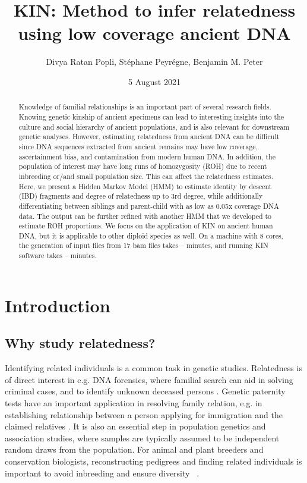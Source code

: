 \documentclass[12pt, letterpaper]{article}
\title{KIN: Method to infer relatedness using low coverage ancient DNA}
\author{Divya Ratan Popli, Stéphane Peyrégne, Benjamin M. Peter}
\date{5 August 2021}
\begin{document}
\nolinenumbers

\maketitle

\begin{abstract}

\noindent Knowledge of familial relationships is an important part of several research fields. Knowing genetic kinship of ancient specimens can lead to interesting insights into the culture and social hierarchy of ancient populations, and is also relevant for downstream genetic analyses. However, estimating relatedness from ancient DNA can be difficult since DNA sequences extracted from ancient remains may have low coverage, ascertainment bias, and contamination from modern human DNA. In addition, the population of interest may have long runs of homozygosity (ROH) due to recent inbreeding or/and small population size. This can affect the relatedness estimates. Here, we present a Hidden Markov Model (HMM) to estimate identity by descent (IBD) fragments and degree of relatedness up to 3rd degree, while additionally differentiating between siblings and parent-child with as low as 0.05x coverage DNA data. The output can be further refined with another HMM that we developed to estimate ROH proportions. We focus on the application of KIN on ancient human DNA, but it is applicable to other diploid species as well. On a machine with 8 cores, the generation of input files from 17 bam files takes -- minutes, and running KIN software takes -- minutes.
\end{abstract}

\section{Introduction}

\subsection{Why study relatedness?}

Identifying related individuals is a common task in genetic studies. Relatedness is of direct interest in e.g. DNA forensics, where familial search can aid in solving criminal cases, and to identify unknown deceased persons \cite{murphy_law_2018,ram_genealogy_2018}. Genetic paternity tests have an important application in resolving family relation, e.g. in establishing relationship between a person applying for immigration and the claimed relatives \cite{egeland_beyond_2000}. It is also an essential  step in population genetics and association studies, where samples are typically assumed to be independent random draws from the population. For animal and plant breeders and conservation biologists, reconstructing pedigrees and finding related individuals is important to avoid inbreeding and ensure diversity ~\cite{habier_impact_2007,oliehoek_estimating_2006,kardos_measuring_2015}.
\end{document}
